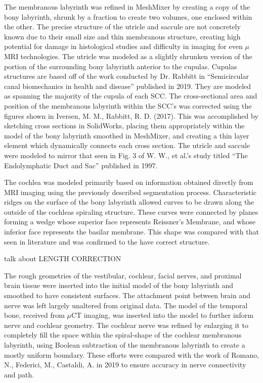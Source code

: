 \documentclass[12pt]{article}
\begin{document}
The membranous labyrinth was refined in MeshMixer by creating a copy of the bony labyrinth, shrunk by a fraction to create two volumes, one enclosed within the other. The precise structure of the utricle and saccule are not concretely known due to their small size and thin membranous structure, creating high potential for damage in histological studies and difficulty in imaging for even $\mu$MRI technologies. The utricle was modeled as a slightly shrunken version of the portion of the surrounding bony labyrinth anterior to the cupulas. Cupulas structures are based off of the work conducted by Dr. Rabbitt in “Semicircular canal biomechanics in health and disease” published in 2019. \cite{rabbitt} They are modeled as spanning the majority of the cupula of each SCC. The cross-sectional area and position of the membranous labyrinth within the SCC’s was corrected using the figures shown in Iversen, M. M., Rabbitt, R. D. (2017). \cite{iversen} This was accomplished by sketching cross sections in SolidWorks, placing them appropriately within the model of the bony labyrinth smoothed in MeshMixer, and creating a thin layer element which dynamically connects each cross section. The utricle and saccule were modeled to mirror that seen in Fig. 3 of W. W., et al.’s study titled “The Endolymphatic Duct and Sac” published in 1997.

The cochlea was modeled primarily based on information obtained directly from MRI imaging using the previously described segmentation process. Characteristic ridges on the surface of the bony labyrinth allowed curves to be drawn along the outside of the cochleas spiraling structure. These curves were connected by planes forming a wedge whose superior face represents Reissner’s Membrane, and whose inferior face represents the basilar membrane. This shape was compared with that seen in literature and was confirmed to the have correct structure. \cite{trevino:chinchmodel} \cite{ekdale:chinchanat} \cite{ni:cochmcx}
 
talk about LENGTH CORRECTION 
 
The rough geometries of the vestibular, cochlear, facial nerves, and proximal brain tissue were inserted into the initial model of the bony labyrinth and smoothed to have consistent surfaces. The attachment point between brain and nerve was left largely unaltered from original data. The model of the temporal bone, received from $\mu$CT imaging, was inserted into the model to further inform nerve and cochlear geometry. The cochlear nerve was refined by enlarging it to completely fill the space within the spiral-shape of the cochlear membranous labyrinth, using Boolean subtraction of the membranous labyrinth to create a mostly uniform boundary. These efforts were compared with the work of Romano, N., Federici, M., Castaldi, A. in 2019 to ensure accuracy in nerve connectivity and path. \cite{romano:nerves}
 
\end{document}
